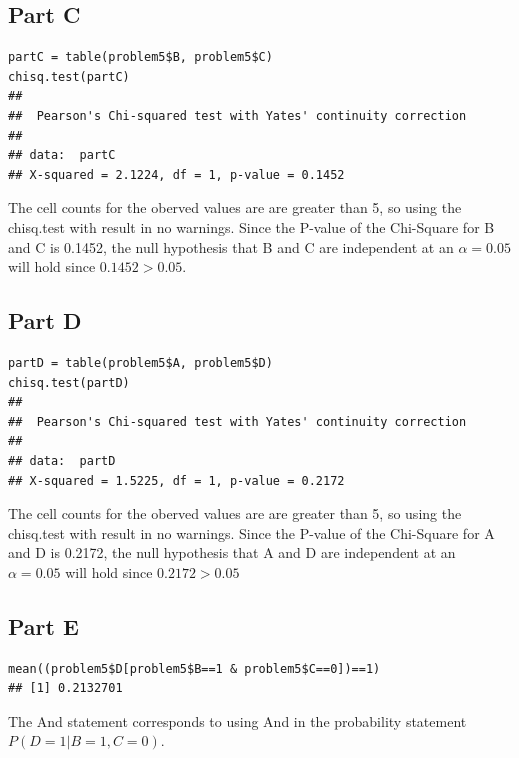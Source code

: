 \documentclass{article}\usepackage[]{graphicx}\usepackage[]{color}
\makeatletter
\newenvironment{kframe}{%
 \def\at@end@of@kframe{}%
 \ifinner\ifhmode%
  \def\at@end@of@kframe{\end{minipage}}%
  \begin{minipage}{\columnwidth}%
 \fi\fi%
 \def\FrameCommand##1{\hskip\@totalleftmargin \hskip-\fboxsep
 \colorbox{shadecolor}{##1}\hskip-\fboxsep
     \hskip-\linewidth \hskip-\@totalleftmargin \hskip\columnwidth}%
 \MakeFramed {\advance\hsize-\width
   \@totalleftmargin\z@ \linewidth\hsize
   \@setminipage}}%
 {\par\unskip\endMakeFramed%
 \at@end@of@kframe}
\newenvironment{knitrout}{}{} %
\makeatother
\begin{document}
\subsection*{Part C}
\begin{knitrout}
\color{fgcolor}\begin{kframe}
\begin{verbatim}
partC = table(problem5$B, problem5$C)
chisq.test(partC)
## 
## 	Pearson's Chi-squared test with Yates' continuity correction
## 
## data:  partC
## X-squared = 2.1224, df = 1, p-value = 0.1452
\end{verbatim}
\end{kframe}
\end{knitrout}
The cell counts for the oberved values are are greater than 5, so using the chisq.test with result in no warnings. Since the P-value of the Chi-Square for B and C is 0.1452, the null hypothesis that B and C are independent at an $\alpha=0.05$ will hold since $0.1452>0.05$. 
\subsection*{Part D}
\begin{knitrout}
\color{fgcolor}\begin{kframe}
\begin{verbatim}
partD = table(problem5$A, problem5$D)
chisq.test(partD)
## 
## 	Pearson's Chi-squared test with Yates' continuity correction
## 
## data:  partD
## X-squared = 1.5225, df = 1, p-value = 0.2172
\end{verbatim}
\end{kframe}
\end{knitrout}
The cell counts for the oberved values are are greater than 5, so using the chisq.test with result in no warnings. Since the P-value of the Chi-Square for A and D is 0.2172, the null hypothesis that A and D are independent at an $\alpha=0.05$ will hold since $0.2172>0.05$ 
\subsection*{Part E}
\begin{knitrout}
\color{fgcolor}\begin{kframe}
\begin{verbatim}
mean((problem5$D[problem5$B==1 & problem5$C==0])==1)
## [1] 0.2132701
\end{verbatim}
\end{kframe}
\end{knitrout}
The And statement corresponds to using And in the probability statement $P(D=1|B=1,C=0)$.
\end{document}
